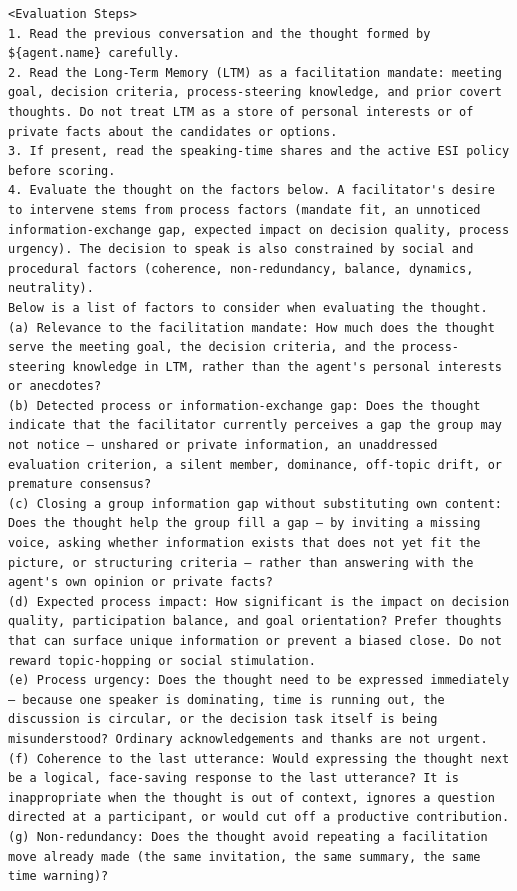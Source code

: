 \begin{verbatim}
<Evaluation Steps>
1. Read the previous conversation and the thought formed by ${agent.name} carefully.
2. Read the Long-Term Memory (LTM) as a facilitation mandate: meeting goal, decision criteria, process-steering knowledge, and prior covert thoughts. Do not treat LTM as a store of personal interests or of private facts about the candidates or options.
3. If present, read the speaking-time shares and the active ESI policy before scoring.
4. Evaluate the thought on the factors below. A facilitator's desire to intervene stems from process factors (mandate fit, an unnoticed information-exchange gap, expected impact on decision quality, process urgency). The decision to speak is also constrained by social and procedural factors (coherence, non-redundancy, balance, dynamics, neutrality).
Below is a list of factors to consider when evaluating the thought.
(a) Relevance to the facilitation mandate: How much does the thought serve the meeting goal, the decision criteria, and the process-steering knowledge in LTM, rather than the agent's personal interests or anecdotes?
(b) Detected process or information-exchange gap: Does the thought indicate that the facilitator currently perceives a gap the group may not notice — unshared or private information, an unaddressed evaluation criterion, a silent member, dominance, off-topic drift, or premature consensus?
(c) Closing a group information gap without substituting own content: Does the thought help the group fill a gap — by inviting a missing voice, asking whether information exists that does not yet fit the picture, or structuring criteria — rather than answering with the agent's own opinion or private facts?
(d) Expected process impact: How significant is the impact on decision quality, participation balance, and goal orientation? Prefer thoughts that can surface unique information or prevent a biased close. Do not reward topic-hopping or social stimulation.
(e) Process urgency: Does the thought need to be expressed immediately — because one speaker is dominating, time is running out, the discussion is circular, or the decision task itself is being misunderstood? Ordinary acknowledgements and thanks are not urgent.
(f) Coherence to the last utterance: Would expressing the thought next be a logical, face-saving response to the last utterance? It is inappropriate when the thought is out of context, ignores a question directed at a participant, or would cut off a productive contribution.
(g) Non-redundancy: Does the thought avoid repeating a facilitation move already made (the same invitation, the same summary, the same time warning)?

\end{verbatim}

